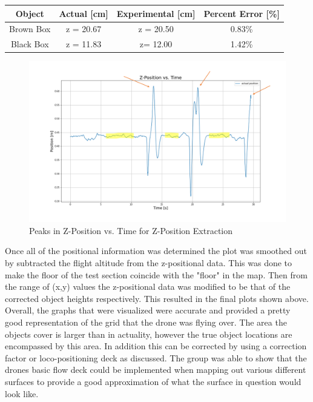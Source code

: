 \begin{center}

    \begin{tabular}{|c|c|c|c|}
        \rowcolor{lightgray} 
        \hline
        \textbf{Object} & \textbf{Actual [cm]} & \textbf{Experimental [cm]} & \textbf{Percent Error [\%]} \\
        \hline
        Brown Box & z = 20.67 & z = 20.50 & 0.83\%\\
        \hline
        Black Box & z = 11.83 & z= 12.00 & 1.42\% \\
        \hline
\end{tabular}
\end{center}

\begin{figure}[H]
  \centering
  \includegraphics[width=1.0\linewidth]{R&D/r2.png}  
  \caption{Peaks in Z-Position vs. Time for Z-Position Extraction}
  \label{fig:r2}
\end{figure}

Once all of the positional information was determined the plot was smoothed out by subtracted the flight altitude from the z-positional data. This was done to make the floor of the test section coincide with the "floor" in the map. Then from the range of (x,y) values the z-positional data was modified to be that of the corrected object heights respectively. This resulted in the final plots shown above. Overall, the graphs that were visualized were accurate and provided a pretty good representation of the grid that the drone was flying over. The area the objects cover is larger than in actuality, however the true object locations are encompassed by this area. In addition this can be corrected by using a correction factor or loco-positioning deck as discussed. The group was able to show that the drones basic flow deck could be implemented when mapping out various different surfaces to provide a good approximation of what the surface in question would look like.
